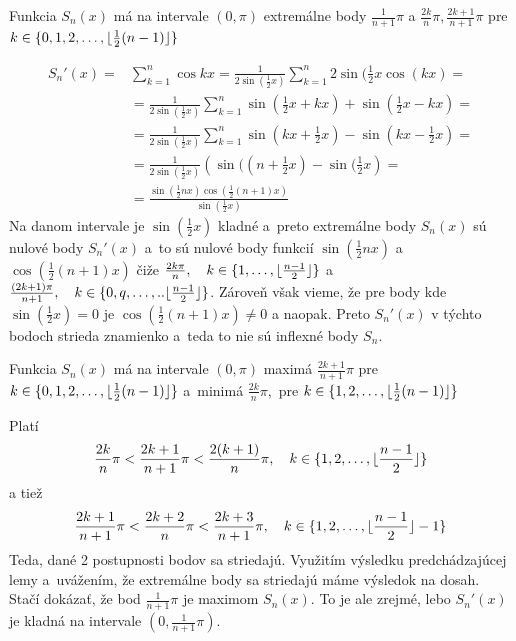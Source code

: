 \begin{lema}
    Funkcia $S_n(x)$ má na intervale $(0,\pi)$ extremálne body
    $\frac{1}{n+1}\pi$ a
    $\frac{2k}{n}\pi, \frac{2k+1}{n+1}\pi$ pre
    $k \in \{0,1,2,\dots,\lfloor \frac{1}{2}(n-1) \rfloor \}$
\end{lema}
\begin{dokaz}
    \begin{align*}
        S_n'(x) =& \sum_{k=1}^n \cos kx = 
            \frac{1}{2\sin(\frac{1}{2}x)} \sum_{k=1}^n 2
            \sin(\frac{1}{2}x \cos(kx) =\\
            &=\frac{1}{2\sin(\frac{1}{2}x)} \sum_{k=1}^n
                \sin(\frac{1}{2}x + kx) +
                \sin(\frac{1}{2}x - kx) = \\
            &=\frac{1}{2\sin(\frac{1}{2}x)} \sum_{k=1}^n
                \sin(kx + \frac{1}{2}x ) -
                \sin(kx - \frac{1}{2}x ) = \\
            &=\frac{1}{2\sin(\frac{1}{2}x)} 
                \left(
                    \sin((n+\frac{1}{2}x) - \sin(\frac{1}{2}x
                \right) = \\
            &=\frac{ \sin(\frac{1}{2}nx) \cos(\frac{1}{2}(n+1)x)}
                {\sin(\frac{1}{2} x)}
    \end{align*}
    Na danom intervale je $\sin(\frac{1}{2} x)$ kladné a~preto
    extremálne body $S_n(x)$ sú nulové
    body $S_n'(x)$ a~to sú nulové body funkcií
     $\sin(\frac{1}{2}nx)$ a $\cos(\frac{1}{2}(n+1)x)$ čiže
     $\frac{2 k \pi}{n},\quad k\in \{1,\dots,\lfloor \frac{n-1}{2} \rfloor\}$ a
     $\frac{(2k+1)\pi}{n+1},\quad k\in
     \{0,q,\dots,..\lfloor \frac{n-1}{2} \rfloor\}$. Zároveň však
     vieme, že pre body kde $\sin(\frac{1}{2} x)=0$ je
     $\cos(\frac{1}{2}(n+1)x)\not=0$ a naopak.
     Preto $S_n'(x)$ v týchto bodoch strieda znamienko a~teda to nie
     sú inflexné body $S_n$.
\end{dokaz}

\begin{lema}
    Funkcia $S_n(x)$ má na intervale $(0,\pi)$ maximá
    $\frac{2k+1}{n+1}\pi$ pre $ k \in \{0,1,2,\dots,\lfloor \frac{1}{2}(n-1) \rfloor \}$
    a~minimá
    $\frac{2k}{n}\pi, $ pre
    $k \in \{1,2,\dots,\lfloor \frac{1}{2}(n-1) \rfloor \}$
\end{lema}
\begin{dokaz}
    Platí
    \begin{equation*}
        \frac{2k}{n}\pi < \frac{2k+1}{n+1}\pi < \frac{2(k+1)}{n} \pi,
        \quad k \in \{1,2,\dots,\lfloor \frac{n-1}{2} \rfloor \}
    \end{equation*}
    a tiež
    \begin{equation*}
        \frac{2k+1}{n+1}\pi < \frac{2k+2}{n}\pi < \frac{2k+3}{n+1} \pi,
        \quad k \in\{1,2,\dots,\lfloor \frac{n-1}{2} \rfloor-1 \}
    \end{equation*}
    Teda, dané 2 postupnosti bodov sa striedajú. Využitím výsledku
    predchádzajúcej lemy a~uvážením, že extremálne body sa striedajú
    máme výsledok na dosah. Stačí dokázať, že bod $\frac{1}{n+1}\pi$
    je maximom $S_n(x)$. To je ale zrejmé, lebo
     $S_n'(x)$ je kladná na intervale $(0, \frac{1}{n+1}\pi)$.
\end{dokaz}

